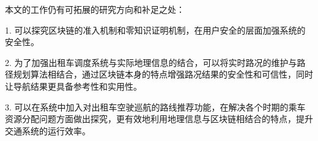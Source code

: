 \begin{conclusion}
本文的工作仍有可拓展的研究方向和补足之处：

1. 可以探究区块链的准入机制和零知识证明机制，在用户安全的层面加强系统的安全性。

2. 为了加强出租车调度系统与实际地理信息的结合，可以将实时路况的维护与路径规划算法相结合，通过区块链本身的特点增强路况结果的安全性和可信性，同时让导航结果更具备参考性和实用性。

3. 可以在系统中加入对出租车空驶巡航的路线推荐功能，在解决各个时期的乘车资源分配问题方面做出探究，更有效地利用地理信息与区块链相结合的特点，提升交通系统的运行效率。





\end{conclusion}